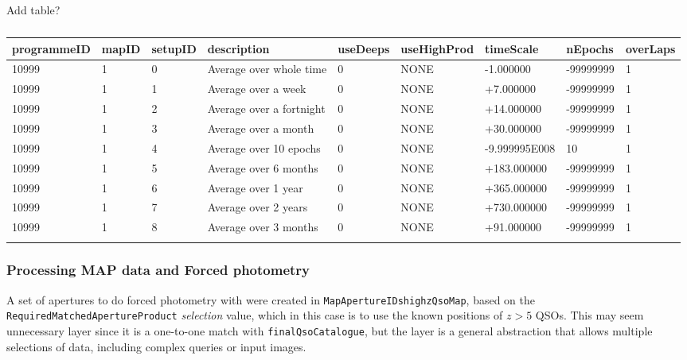 \documentclass[usenatbib]{mnras}
\begin{document}
    Add table?
    \begin{table*}
      \begin{center}
        \setlength{\tabcolsep}{4pt}
        \begin{tabular}{ll lll lll l}
          \hline \hline
   programmeID &	mapID &	setupID  &	description               &	useDeeps  &	useHighProd &	timeScale	    &  nEpochs     &	overLaps\\
          \hline
10999	& 1 & 0 & Average over whole time & 0 &	NONE &	-1.000000 &	-99999999 &	1 \\
10999	& 1 & 1 & Average over a week &	0 & NONE & +7.000000 &	-99999999 &	1\\
10999	& 1 & 2	& Average over a fortnight & 0 & NONE &	+14.000000 & -99999999 & 1\\
10999	& 1 & 3	& Average over a month & 0 & NONE & +30.000000 & -99999999 & 1\\
10999	& 1 & 4	& Average over 10 epochs & 0 & NONE & -9.999995E008 & 10 & 1\\
10999	& 1 & 5 & Average over 6 months	& 0 & NONE & +183.000000 & -99999999 & 1 \\
10999	& 1 & 6	& Average over 1 year &	0 & NONE & +365.000000 & -99999999 & 1 \\
10999	& 1 & 7	& Average over 2 years & 0 & NONE & +730.000000	& -99999999 & 1 \\
10999	& 1 & 8 & Average over 3 months & 0 & NONE & +91.000000	& -99999999 & 1 \\
          \hline \hline
          \label{tab:reqMapAvg}
        \end{tabular}
        \caption{}
      \end{center}
    \end{table*}
    
    
    \subsubsection{Processing MAP data and Forced photometry} 
    A set of apertures to do forced photometry with were created in 
    \verb+MapApertureIDshighzQsoMap+, based on the \verb+RequiredMatchedApertureProduct+ 
    {\it selection} value, which in this case is to use the known positions of $z>5$ QSOs. This may
    seem unnecessary layer since it is a one-to-one match with \verb+finalQsoCatalogue+,
    but the layer is a general abstraction that allows multiple selections of data, including complex queries
    or input images.
    
\end{document}
